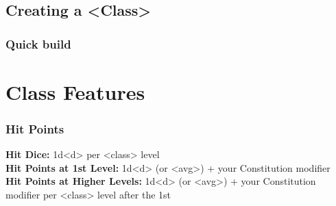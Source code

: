 \subsection{Creating a <Class>}

\lipsum[1]

\subsubsection{Quick build}

\lipsum[1]


\section*{Class Features}

\subsubsection{Hit Points}
\textbf{Hit Dice:} 1d<d> per <class> level\\
\textbf{Hit Points at 1st Level:} 1d<d> (or <avg>) + your Constitution modifier\\
\textbf{Hit Points at Higher Levels:} 1d<d> (or <avg>) + your Constitution modifier per <class> level after the 1st\\


